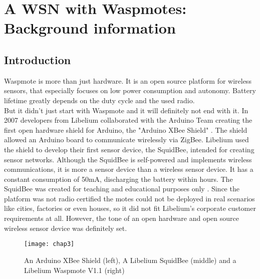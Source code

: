 \section{A WSN with Waspmotes: Background information}
\label{Chapter3}
\subsection{Introduction}
Waspmote is more than just hardware. It is an open source platform for wireless sensors, that especially focuses on low power consumption and autonomy. Battery lifetime greatly depends on the duty cycle and the used radio.\\ 
But it didn't just start with Waspmote and it will definitely not end with it. In 2007 developers from Libelium collaborated with the Arduino Team creating the first open hardware shield for Arduino, the "Arduino XBee Shield" . The shield allowed an Arduino board to communicate wirelessly via ZigBee. Libelium used the shield to develop their first sensor device, the SquidBee, intended for creating sensor networks. Although the SquidBee is self-powered and implements wireless communications, it is more a sensor device than a wireless sensor device. It has a constant consumption of 50mA, discharging the battery within hours. The SquidBee was created for teaching and educational purposes only . Since the platform was not radio certified the motes could not be deployed in real scenarios like cities, factories or even houses, so it did not fit Libelium's corporate customer requirements at all. However, the tone of an open hardware and open source wireless sensor device was definitely set.
\begin{figure*}[ht]
\centering
\texttt{[image: chap3]}
\caption{An Arduino XBee Shield (left), A Libelium SquidBee (middle) and a Libelium Waspmote V1.1 (right)}
\label{fig:chap3}
\end{figure*}\\
